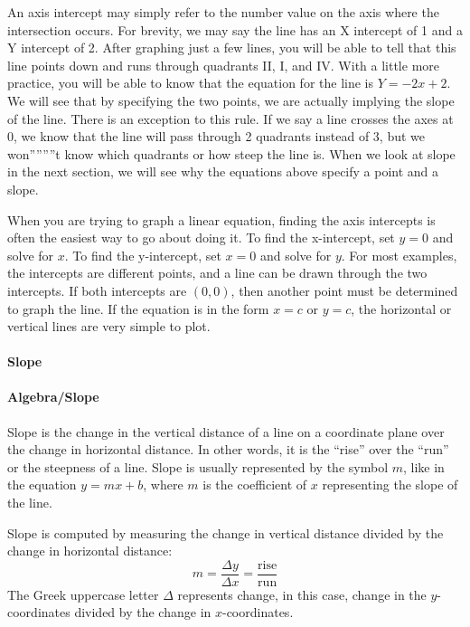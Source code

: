 An axis intercept may simply refer to the number value on the axis where the intersection occurs. For brevity, we may say the line has an X intercept of 1 and a Y intercept of 2. After graphing just a few lines, you will be able to tell that this line points down and runs through quadrants II, I, and IV. With a little more practice, you will be able to know that the equation for the line is $Y = -2x + 2$. We will see that by specifying the two points, we are actually implying the slope of the line. There is an exception to this rule. If we say a line crosses the axes at 0, we know that the line will pass through 2 quadrants instead of 3, but we won''''''''t know which quadrants or how steep the line is. When we look at slope in the next section, we will see why the equations above specify a point and a slope.

When you are trying to graph a linear equation, finding the axis intercepts is often the easiest way to go about doing it. To find the x-intercept, set $y = 0$ and solve for $x$. To find the y-intercept, set $x = 0$ and solve for $y$. For most examples, the intercepts are different points, and a line can be drawn through the two intercepts. If both intercepts are $(0,0)$, then another point must be determined to graph the line. If the equation is in the form $x = c$ or $y = c$, the horizontal or vertical lines are very simple to plot.

\paragraph{Slope}

\paragraph{Algebra/Slope}

Slope is the change in the vertical distance of a line on a coordinate plane over the change in horizontal distance. In other words, it is the “rise” over the “run” or the steepness of a line. Slope is usually represented by the symbol $m$, like in the equation $y = mx + b$, where $m$ is the coefficient of $x$ representing the slope of the line.

Slope is computed by measuring the change in vertical distance divided by the change in horizontal distance:
$$
m = \frac{\Delta y}{\Delta x} = \frac{\text{rise}}{\text{run}}
$$
The Greek uppercase letter $\Delta$ represents change, in this case, change in the $y$-coordinates divided by the change in $x$-coordinates.

